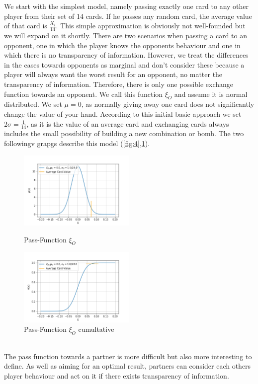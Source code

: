 We start with the simplest model, namely passing exactly one card to any other player from their set of 14 cards. If he passes any random card, the average value of that card is $\frac{X_i}{14}$. This simple approximation is obviously not well-founded but we will expand on it shortly. There are two scenarios when passing a card to an opponent, one in which the player knows the opponents behaviour and one in which there is no transparency of information. However, we treat the differences in the cases towards opponents as marginal and don’t consider these because a player will always want the worst result for an opponent, no matter the transparency of information. Therefore, there is only one possible exchange function towards an opponent. We call this function $\xi_O$ and assume it is normal distributed. We set $\mu = 0$, as normally giving away one card does not significantly change the value of your hand. According to this initial basic approach we set $2\sigma = \frac{1}{14}$, as it is the value of an average card and exchanging cards always includes the small possibility of building a new combination or bomb. The two followingv grapgs describe this model (\ref{fig:4},\ref{fig:5}).
 \\
\begin{figure}[h]
    \centering
    \includegraphics[width=0.5\textwidth]{Bilder/b1_a}
    \caption{Pass-Function $\xi_O$}
    \label{fig:4}
    \centering
    \includegraphics[width=0.5\textwidth]{Bilder/b1_b}
    \caption{Pass-Function $\xi_O$ cumultative}
    \label{fig:5}
\end{figure}
\\
The pass function towards a partner is more difficult but also more interesting to define. As well as aiming for an optimal result, partners can consider each others player behaviour and act on it if there exists transparency of information.

